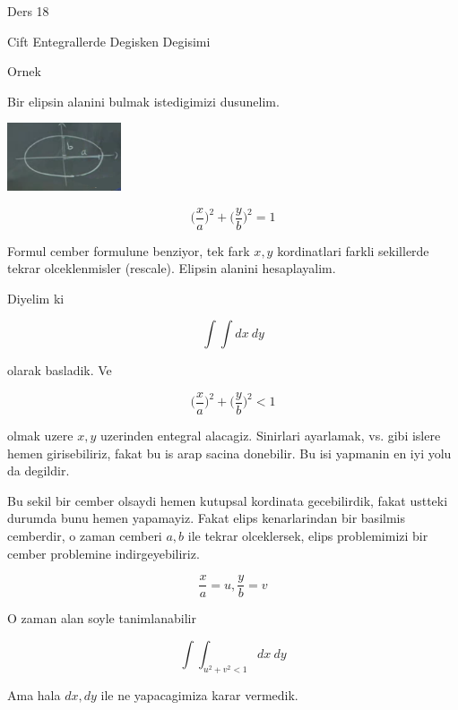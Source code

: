 \documentclass[12pt,fleqn]{article}
\begin{document}
Ders 18

Cift Entegrallerde Degisken Degisimi 

Ornek 

Bir elipsin alanini bulmak istedigimizi dusunelim. 

\includegraphics[height=2cm]{18_1.png}

\[ \bigg(\frac{x}{a}\bigg)^2 + \bigg(\frac{y}{b}\bigg)^2 = 1 \]

Formul cember formulune benziyor, tek fark $x,y$ kordinatlari farkli
sekillerde tekrar olceklenmisler (rescale). Elipsin alanini hesaplayalim. 

Diyelim ki 

\[ \int \int dx \ dy \]

olarak basladik. Ve

\[ \bigg(\frac{x}{a}\bigg)^2 + \bigg(\frac{y}{b}\bigg)^2 < 1 \]

olmak uzere $x,y$ uzerinden entegral alacagiz. Sinirlari ayarlamak,
vs. gibi islere hemen girisebiliriz, fakat bu is arap sacina donebilir. Bu
isi yapmanin en iyi yolu da degildir. 

Bu sekil bir cember olsaydi hemen kutupsal kordinata gecebilirdik, fakat
ustteki durumda bunu hemen yapamayiz. Fakat elips kenarlarindan bir basilmis
cemberdir, o zaman cemberi $a,b$ ile tekrar olceklersek, elips problemimizi
bir cember problemine indirgeyebiliriz. 

\[ \frac{x}{a} = u, \frac{y}{b} = v \]

O zaman alan soyle tanimlanabilir 

\[ \int \int_{u^2 + v^2 < 1} dx \ dy \]

Ama hala $dx,dy$ ile ne yapacagimiza karar vermedik. 
\end{document}
